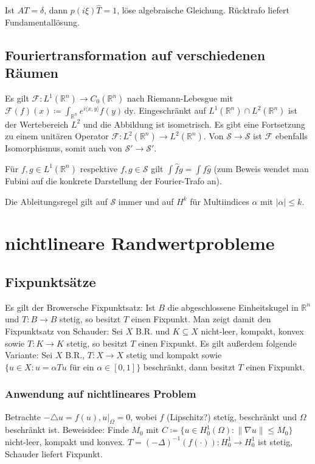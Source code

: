 \documentclass[11pt,a4paper]{scrartcl}
\newcommand{\R}{\mathbb{R}} %
\newcommand{\Sc}{\mathcal{S}}
\newcommand{\F}{\mathcal{F}}
\newcommand{\laplace}{\triangle}
\theoremstyle{plain}
\theoremstyle{definition}
\theoremstyle{remark}
\begin{document}
Ist $AT=\delta$, dann $p(i\xi)\hat T = 1$, löse algebraische Gleichung. Rücktrafo liefert Fundamentallösung.

\subsection{Fouriertransformation auf verschiedenen Räumen}

Es gilt $\F: L^1(\R^n) \to C_0(\R^n)$ nach Riemann-Lebesgue mit $\F(f)(x)\coloneqq \int_{\R^n} e^{i\langle x,y \rangle}f(y) \, \mathrm{dy}$. Eingeschränkt auf $L^1(\R^n) \cap L^2(\R^n)$ ist der Wertebereich $L^2$ und die Abbildung ist isometrisch. Es gibt eine Fortsetzung zu einem unitären Operator $\F: L^2(\R^n)\to L^2(\R^n)$. Von $\Sc\to \Sc$ ist $\F$ ebenfalls Isomorphismus, somit auch von $\Sc'\to \Sc'$.

Für $f,g\in L^1(\R^n)$ respektive $f,g\in \Sc$ gilt $\int \hat f g = \int f \hat g$ (zum Beweis wendet man Fubini auf die konkrete Darstellung der Fourier-Trafo an).

Die Ableitungsregel gilt auf $\Sc$ immer und auf $H^k$ für Multiindices $\alpha$ mit $|\alpha| \leq k$.

\section{nichtlineare Randwertprobleme}

\subsection{Fixpunktsätze}

Es gilt der Browersche Fixpunktsatz: Ist $B$ die abgeschlossene Einheitskugel in $\R^n$ und $T:B\to B$ stetig, so besitzt $T$ einen Fixpunkt. Man zeigt damit den Fixpunktsatz von Schauder: Sei $X$ B.R. und $K\subseteq X$ nicht-leer, kompakt, konvex sowie $T:K\to K$ stetig, so besitzt $T$ einen Fixpunkt. Es gilt außerdem folgende Variante: Sei $X$ B.R., $T:X\to X$ stetig und kompakt sowie $\{ u\in X: u = \alpha Tu \text{ für ein } \alpha \in [0,1]\}$ beschränkt, dann besitzt $T$ einen Fixpunkt.

\subsubsection{Anwendung auf nichtlineares Problem}

Betrachte $-\laplace u = f(u), u|_\Omega = 0$, wobei $f$ (Lipschitz?) stetig, beschränkt und $\Omega$ beschränkt ist. Beweisidee: Finde $M_0$ mit $C\coloneqq \{ u\in H^1_0(\Omega): \|\nabla u\| \leq M_0\}$ nicht-leer, kompakt und konvex. $T = (-\Delta)^{-1}(f(\cdot)): H^1_0\to H^1_0$ ist stetig, Schauder liefert Fixpunkt.
\end{document}
